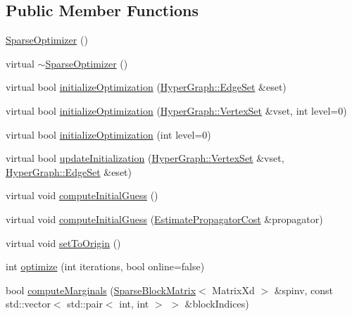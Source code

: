 \subsection*{Public Member Functions}
\begin{DoxyCompactItemize}
\item 
\mbox{\hyperlink{classg2o_1_1_sparse_optimizer_a00492515b99393555aec477ab486195b}{Sparse\+Optimizer}} ()
\item 
virtual \mbox{\hyperlink{classg2o_1_1_sparse_optimizer_a3c3602d865a05486a94ce48c6839bbd6}{$\sim$\+Sparse\+Optimizer}} ()
\item 
virtual bool \mbox{\hyperlink{classg2o_1_1_sparse_optimizer_a56c0c13954ac7204cfb031c141ece9ae}{initialize\+Optimization}} (\mbox{\hyperlink{classg2o_1_1_hyper_graph_a5e2970e236c0dcb4eff7c205d7b6b4ae}{Hyper\+Graph\+::\+Edge\+Set}} \&eset)
\item 
virtual bool \mbox{\hyperlink{classg2o_1_1_sparse_optimizer_ab16dd36e32577ba5856239ce721ec70b}{initialize\+Optimization}} (\mbox{\hyperlink{classg2o_1_1_hyper_graph_a703938cdb4bb636860eed55a2489d70c}{Hyper\+Graph\+::\+Vertex\+Set}} \&vset, int level=0)
\item 
virtual bool \mbox{\hyperlink{classg2o_1_1_sparse_optimizer_ace3994bf5f403c7fa0305635aa598473}{initialize\+Optimization}} (int level=0)
\item 
virtual bool \mbox{\hyperlink{classg2o_1_1_sparse_optimizer_ae971d068585055973798f93ac2363d94}{update\+Initialization}} (\mbox{\hyperlink{classg2o_1_1_hyper_graph_a703938cdb4bb636860eed55a2489d70c}{Hyper\+Graph\+::\+Vertex\+Set}} \&vset, \mbox{\hyperlink{classg2o_1_1_hyper_graph_a5e2970e236c0dcb4eff7c205d7b6b4ae}{Hyper\+Graph\+::\+Edge\+Set}} \&eset)
\item 
virtual void \mbox{\hyperlink{classg2o_1_1_sparse_optimizer_a59db9f16934d3b9f7a52511f0be1bb07}{compute\+Initial\+Guess}} ()
\item 
virtual void \mbox{\hyperlink{classg2o_1_1_sparse_optimizer_a2fba11c8572fce4a8c1bcca4fa3e43fb}{compute\+Initial\+Guess}} (\mbox{\hyperlink{classg2o_1_1_estimate_propagator_cost}{Estimate\+Propagator\+Cost}} \&propagator)
\item 
virtual void \mbox{\hyperlink{classg2o_1_1_sparse_optimizer_ab8af902464774ec3d3910a3674791714}{set\+To\+Origin}} ()
\item 
int \mbox{\hyperlink{classg2o_1_1_sparse_optimizer_a098257ee6f13dbb79be07075244d9930}{optimize}} (int iterations, bool online=false)
\item 
bool \mbox{\hyperlink{classg2o_1_1_sparse_optimizer_a656be8b8244a48dc1207f29eec77af5a}{compute\+Marginals}} (\mbox{\hyperlink{classg2o_1_1_sparse_block_matrix}{Sparse\+Block\+Matrix}}$<$ Matrix\+Xd $>$ \&spinv, const std\+::vector$<$ std\+::pair$<$ int, int $>$ $>$ \&block\+Indices)

\end{DoxyCompactItemize}
